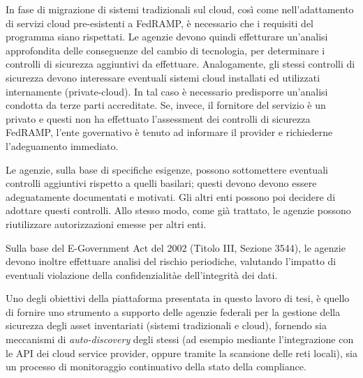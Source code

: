 \documentclass[../main.tex]{subfiles}
\begin{document}
In fase di migrazione di sistemi tradizionali sul cloud, così come nell'adattamento di servizi cloud pre-esistenti a FedRAMP, è necessario che i requisiti del programma siano rispettati. Le agenzie devono quindi effetturare un'analisi approfondita delle conseguenze del cambio di tecnologia, per determinare i controlli di sicurezza aggiuntivi da effettuare.
Analogamente, gli stessi controlli di sicurezza devono interessare eventuali sistemi cloud installati ed utilizzati internamente (private-cloud). In tal caso è necessario predisporre un'analisi condotta da terze parti accreditate.
Se, invece, il fornitore del servizio è un privato e questi non ha effettuato l'assessment dei controlli di sicurezza FedRAMP, l'ente governativo è tenuto ad informare il provider e richiederne l'adeguamento immediato. 

Le agenzie, sulla base di specifiche esigenze, possono sottomettere eventuali controlli aggiuntivi rispetto a quelli basilari; questi devono devono essere adeguatamente documentati e motivati. Gli altri enti possono poi decidere di adottare questi controlli.
Allo stesso modo, come già trattato, le agenzie possono riutilizzare autorizzazioni emesse per altri enti.

Sulla base del E-Government Act del 2002 (Titolo III, Sezione 3544), le agenzie devono inoltre effettuare analisi del rischio periodiche, valutando l'impatto di eventuali violazione della confidenzialitàe dell'integrità dei dati\cite{fedrampFramework}.

Uno degli obiettivi della piattaforma presentata in questo lavoro di tesi, è quello di fornire uno strumento a supporto delle agenzie federali per la gestione della sicurezza degli asset inventariati (sistemi tradizionali e cloud), fornendo sia meccanismi di \textit{auto-discovery} degli stessi (ad esempio mediante l'integrazione con le API dei cloud service provider, oppure tramite la scansione delle reti locali), sia un processo di monitoraggio continuativo della stato della compliance.
\end{document}
